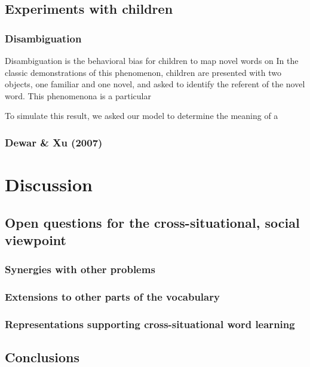 \documentclass[man,noapacite,12pt]{apa2}
\begin{document}
\subsection{Experiments with children}

\subsubsection{Disambiguation}
Disambiguation is the behavioral bias for children to map novel words on  In the classic demonstrations of this phenomenon, children are presented with two objects, one familiar and one novel, and asked to identify the referent of the novel word. This phenomenona is a particular

To simulate this result, we asked our model to determine the meaning of a 

\subsubsection{Dewar \& Xu (2007)}



\section{Discussion}



\subsection{Open questions for the cross-situational, social viewpoint}

\subsubsection{Synergies with other problems}

\subsubsection{Extensions to other parts of the vocabulary}

\subsubsection{Representations supporting cross-situational word learning}

\cite{yurovskyunderreview}

\subsection{Conclusions}

\newpage



\end{document}
